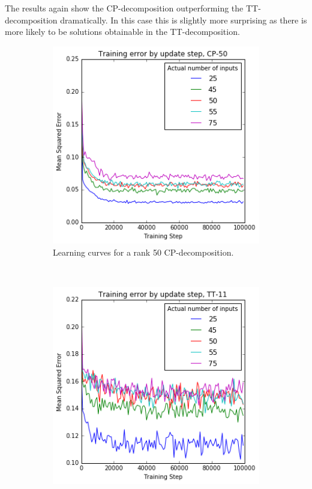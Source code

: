 The results again show the CP-decomposition outperforming the TT-decomposition dramatically.
In this case this is slightly more surprising as there is more likely to be solutions
obtainable in the TT-decomposition.


\begin{figure}
	\begin{subfigure}[t]{0.45\textwidth}
		\includegraphics[width=\textwidth]{tensors/correlatecp50-mom}
		\caption{Learning curves for a rank 50 CP-decomposition.}
	\end{subfigure}
	~
	\begin{subfigure}[t]{0.45\textwidth}
		\includegraphics[width=\textwidth]{tensors/correlatett11-mom}

\end{subfigure}
\end{figure}
